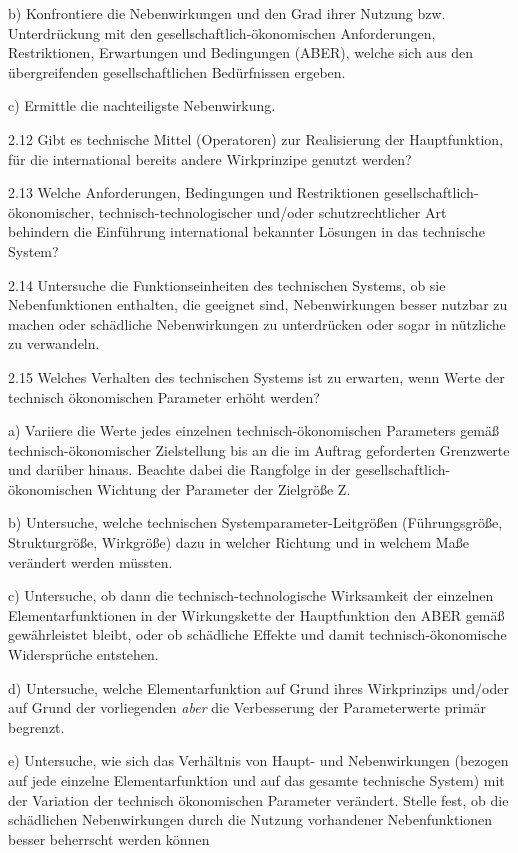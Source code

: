 \documentclass[12pt,a4paper]{article}
\begin{document}
b) Konfrontiere die Nebenwirkungen und den Grad ihrer Nutzung
bzw. Unterdrückung mit den gesellschaftlich-ökonomischen Anforderungen,
Restriktionen, Erwartungen und Bedingungen (ABER), welche sich aus den
übergreifenden gesellschaftlichen Bedürfnissen ergeben.

c) Ermittle die nachteiligste Nebenwirkung.

2.12 Gibt es technische Mittel (Operatoren) zur Realisierung der Hauptfunktion,
für die international bereits andere Wirkprinzipe genutzt werden?

2.13 Welche Anforderungen, Bedingungen und Restriktionen
gesellschaftlich-ökonomischer, technisch-technologischer und/oder
schutzrechtlicher Art behindern die Einführung international bekannter Lösungen
in das technische System?

2.14 Untersuche die Funktionseinheiten des technischen Systems, ob sie
Nebenfunktionen enthalten, die geeignet sind, Nebenwirkungen besser nutzbar zu
machen oder schädliche Nebenwirkungen zu unterdrücken oder sogar in nützliche
zu verwandeln.

2.15 Welches Verhalten des technischen Systems ist zu erwarten, wenn Werte der
technisch ökonomischen Parameter erhöht werden?

a) Variiere die Werte jedes einzelnen technisch-ökonomischen Parameters gemäß
technisch-ökonomischer Zielstellung bis an die im Auftrag geforderten
Grenzwerte und darüber hinaus. Beachte dabei die Rangfolge in der
gesellschaftlich-ökonomischen Wichtung der Parameter der Zielgröße Z.

b) Untersuche, welche technischen Systemparameter-Leitgrößen (Führungsgröße,
Strukturgröße, Wirkgröße) dazu in welcher Richtung und in welchem Maße
verändert werden müssten.

c) Untersuche, ob dann die technisch-technologische Wirksamkeit der einzelnen
Elementarfunktionen in der Wirkungskette der Hauptfunktion den ABER gemäß
gewährleistet bleibt, oder ob schädliche Effekte und damit
technisch-ökonomische Widersprüche entstehen.

d) Untersuche, welche Elementarfunktion auf Grund ihres Wirkprinzips und/oder
auf Grund der vorliegenden \emph{aber} die Verbesserung der Parameterwerte
primär begrenzt.

e) Untersuche, wie sich das Verhältnis von Haupt- und Nebenwirkungen (bezogen
auf jede einzelne Elementarfunktion und auf das gesamte technische System) mit
der Variation der technisch ökonomischen Parameter verändert. Stelle fest, ob
die schädlichen Nebenwirkungen durch die Nutzung vorhandener Nebenfunktionen
besser beherrscht werden können
\end{document}
